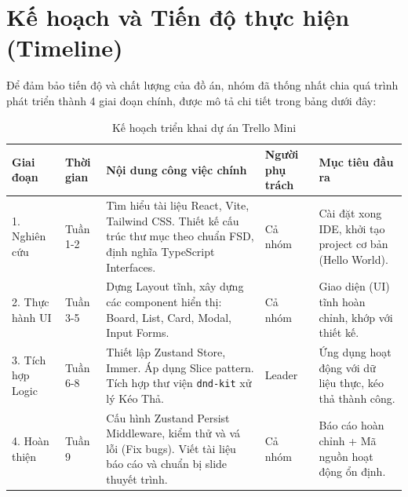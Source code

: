 \section{Kế hoạch và Tiến độ thực hiện (Timeline)}
Để đảm bảo tiến độ và chất lượng của đồ án, nhóm đã thống nhất chia quá trình phát triển thành 4 giai đoạn chính, được mô tả chi tiết trong bảng dưới đây:

\begin{table}[!ht]
    \centering
    \small
    \begin{tabularx}{\textwidth}{|l|l|>{\raggedright\arraybackslash}X|l|>{\raggedright\arraybackslash}X|}
    \hline
    \textbf{Giai đoạn} & \textbf{Thời gian} & \textbf{Nội dung công việc chính} & \textbf{Người phụ trách} & \textbf{Mục tiêu đầu ra} \\ \hline
    1. Nghiên cứu & Tuần 1-2 & Tìm hiểu tài liệu React, Vite, Tailwind CSS. Thiết kế cấu trúc thư mục theo chuẩn FSD, định nghĩa TypeScript Interfaces. & Cả nhóm & Cài đặt xong IDE, khởi tạo project cơ bản (Hello World). \\ \hline
    2. Thực hành UI & Tuần 3-5 & Dựng Layout tĩnh, xây dựng các component hiển thị: Board, List, Card, Modal, Input Forms. & Cả nhóm & Giao diện (UI) tĩnh hoàn chỉnh, khớp với thiết kế. \\ \hline
    3. Tích hợp Logic& Tuần 6-8 & Thiết lập Zustand Store, Immer. Áp dụng Slice pattern. Tích hợp thư viện \texttt{dnd-kit} xử lý Kéo Thả. & Leader & Ứng dụng hoạt động với dữ liệu thực, kéo thả thành công. \\ \hline
    4. Hoàn thiện & Tuần 9 & Cấu hình Zustand Persist Middleware, kiểm thử và vá lỗi (Fix bugs). Viết tài liệu báo cáo và chuẩn bị slide thuyết trình. & Cả nhóm & Báo cáo hoàn chỉnh + Mã nguồn hoạt động ổn định. \\ \hline
    \end{tabularx}
    \caption{Kế hoạch triển khai dự án Trello Mini}
\end{table}

